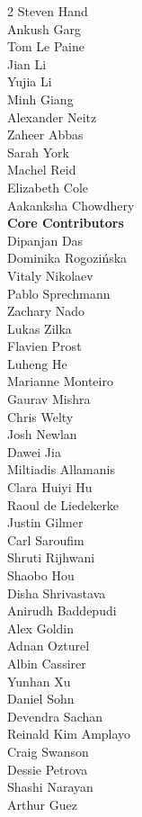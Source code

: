\begin{multicols}{2}
Steven Hand \\
Ankush Garg \\
Tom Le Paine \\
Jian Li \\
Yujia Li \\
Minh Giang \\
Alexander Neitz \\
Zaheer Abbas \\
Sarah York \\
Machel Reid \\
Elizabeth Cole \\
Aakanksha Chowdhery \\
\noindent
\textbf{Core Contributors} \\
Dipanjan Das \\
Dominika Rogozińska \\
Vitaly Nikolaev \\
Pablo Sprechmann \\
Zachary Nado \\
Lukas Zilka \\
Flavien Prost \\
Luheng He \\
Marianne Monteiro \\
Gaurav Mishra \\
Chris Welty \\
Josh Newlan \\
Dawei Jia \\
Miltiadis Allamanis \\
Clara Huiyi Hu \\
Raoul de Liedekerke \\
Justin Gilmer \\
Carl Saroufim \\
Shruti Rijhwani \\
Shaobo Hou \\
Disha Shrivastava \\
Anirudh Baddepudi \\
Alex Goldin \\
Adnan Ozturel \\
Albin Cassirer \\
Yunhan Xu \\
Daniel Sohn \\
Devendra Sachan \\
Reinald Kim Amplayo \\
Craig Swanson \\
Dessie Petrova \\
Shashi Narayan \\
Arthur Guez \\

\end{multicols}
